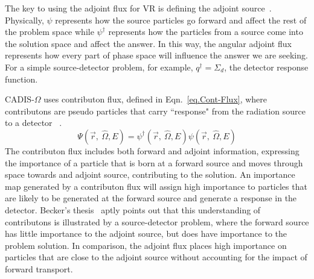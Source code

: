 \documentclass[12pt]{article}
\newcommand{\vOmega}{\ensuremath{\hat{\Omega}}}
\begin{document}
The key to using the adjoint flux for VR is defining the adjoint source~\cite{wagner_forward-weighted_2007}. 
Physically, $\psi$ represents how the source particles go forward and affect the rest of the problem space while $\psi^{\dagger}$ represents how the particles from a source come into the solution space and affect the answer. 
In this way, the angular adjoint flux represents how every part of phase space will influence the answer we are seeking.
For a simple source-detector problem, for example, $q^\dagger = \Sigma _{ d }$, the detector response function. 

CADIS-$\Omega$ uses contributon flux, defined in Eqn.~\eqref{eq.Cont-Flux}, where contributons are pseudo particles that carry ``response" from the radiation source to a detector ~\cite{williams_generalized_1991,williams_contributorn_1992,williams_contributon_study}. 
%
\begin{equation}
\Psi (\vec {r},\:\hat\Omega ,E) = \psi^{\dagger} (\vec {r},\:\hat\Omega ,E) \psi(\vec {r} ,\:\hat\Omega,E)
\label{eq.Cont-Flux} 
\end{equation}
%
The contributon flux includes both forward and adjoint information, expressing the importance of a particle that is born at a forward source and moves through space towards and adjoint source, contributing to the solution.
An importance map generated by a contributon flux will assign high importance to particles that are likely to be generated at the forward source and generate a response in the detector. 
Becker's thesis~\cite{becker_hybrid_2009} aptly points out that this understanding of contributons is illustrated by a source-detector problem, where the forward source has little importance to the adjoint source, but does have importance to the problem solution.
In comparison, the adjoint flux places high importance on particles that are close to the adjoint source without accounting for the impact of forward transport. 
\end{document}
